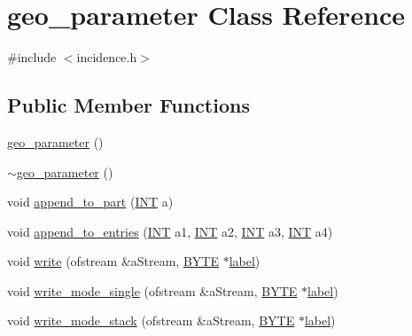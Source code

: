 \hypertarget{classgeo__parameter}{}\section{geo\+\_\+parameter Class Reference}
\label{classgeo__parameter}


{\ttfamily \#include $<$incidence.\+h$>$}

\subsection*{Public Member Functions}
\begin{DoxyCompactItemize}
\item 
\mbox{\hyperlink{classgeo__parameter_acf01f08b14cf37ae450cec17fb11f1ab}{geo\+\_\+parameter}} ()
\item 
\mbox{\hyperlink{classgeo__parameter_a3bccc6a0b3b60e438e06c6116db0d89b}{$\sim$geo\+\_\+parameter}} ()
\item 
void \mbox{\hyperlink{classgeo__parameter_ae88b57e7846d5a3b4ea281139bc08e69}{append\+\_\+to\+\_\+part}} (\mbox{\hyperlink{galois_8h_a09fddde158a3a20bd2dcadb609de11dc}{I\+NT}} a)
\item 
void \mbox{\hyperlink{classgeo__parameter_a499c69553a09758bb9afa51ac12dc573}{append\+\_\+to\+\_\+entries}} (\mbox{\hyperlink{galois_8h_a09fddde158a3a20bd2dcadb609de11dc}{I\+NT}} a1, \mbox{\hyperlink{galois_8h_a09fddde158a3a20bd2dcadb609de11dc}{I\+NT}} a2, \mbox{\hyperlink{galois_8h_a09fddde158a3a20bd2dcadb609de11dc}{I\+NT}} a3, \mbox{\hyperlink{galois_8h_a09fddde158a3a20bd2dcadb609de11dc}{I\+NT}} a4)
\item 
void \mbox{\hyperlink{classgeo__parameter_a685714e059a2a6e9b44992c9ad7912cc}{write}} (ofstream \&a\+Stream, \mbox{\hyperlink{galois_8h_ab6cc7b4aeb6ea31aba2b3fbfc83ff5e6}{B\+Y\+TE}} $\ast$\mbox{\hyperlink{classgeo__parameter_a493494adde94a7449804b2a06f12effa}{label}})
\item 
void \mbox{\hyperlink{classgeo__parameter_a5097d773e635d3c7fe6a7aaf06cf87d4}{write\+\_\+mode\+\_\+single}} (ofstream \&a\+Stream, \mbox{\hyperlink{galois_8h_ab6cc7b4aeb6ea31aba2b3fbfc83ff5e6}{B\+Y\+TE}} $\ast$\mbox{\hyperlink{classgeo__parameter_a493494adde94a7449804b2a06f12effa}{label}})
\item 
void \mbox{\hyperlink{classgeo__parameter_a38d2ab99d749dbdbf6c92e732bc41f05}{write\+\_\+mode\+\_\+stack}} (ofstream \&a\+Stream, \mbox{\hyperlink{galois_8h_ab6cc7b4aeb6ea31aba2b3fbfc83ff5e6}{B\+Y\+TE}} $\ast$\mbox{\hyperlink{classgeo__parameter_a493494adde94a7449804b2a06f12effa}{label}})

\end{DoxyCompactItemize}
